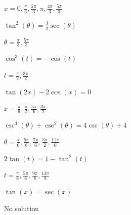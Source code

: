 \documentclass{ximera}
\begin{document}
\begin{question}
\begin{problem}
\begin{solution}
$x = 0, \frac{\pi}{3}, \frac{2\pi}{3}, \pi, \frac{4\pi}{3}, \frac{5\pi}{3}$
\end{solution}
\end{problem}

\begin{problem}
$\tan^{2} \left( \theta \right) = \frac{3}{2} \sec \left( \theta \right)$

\begin{solution}
$\theta  = \frac{\pi}{3}, \frac{5\pi}{3}$
\end{solution}
\end{problem}

\begin{problem}
$\cos^{3} \left( t \right) = -\cos \left( t \right)$ 

\begin{solution}
$t = \frac{\pi}{2}, \frac{3\pi}{2}$
\end{solution}
\end{problem}

\begin{problem}
$\tan (2x) - 2\cos(x) = 0$

\begin{solution}
$x = \frac{\pi}{6}, \frac{\pi}{2}, \frac{5\pi}{6}, \frac{3\pi}{2}$
\end{solution}
\end{problem}

\begin{problem}
$\csc^{3}(\theta) + \csc^{2}(\theta) = 4\csc(\theta) + 4$

\begin{solution}
$\theta = \frac{\pi}{6}, \frac{5\pi}{6}, \frac{7\pi}{6}, \frac{3\pi}{2}, \frac{11\pi}{6}$
\end{solution}
\end{problem}

\begin{problem}
$2\tan(t) = 1 - \tan^{2}(t)$

\begin{solution}
$t = \frac{\pi}{8}, \frac{5\pi}{8}, \frac{9\pi}{8}, \frac{13\pi}{8}$
\end{solution}
\end{problem}

\begin{problem} \label{solveidentlast}
$\tan \left( x \right) = \sec \left( x \right)$ 

\begin{solution}
No solution 
\end{solution}
\end{problem}

\end{question}
\end{document}
